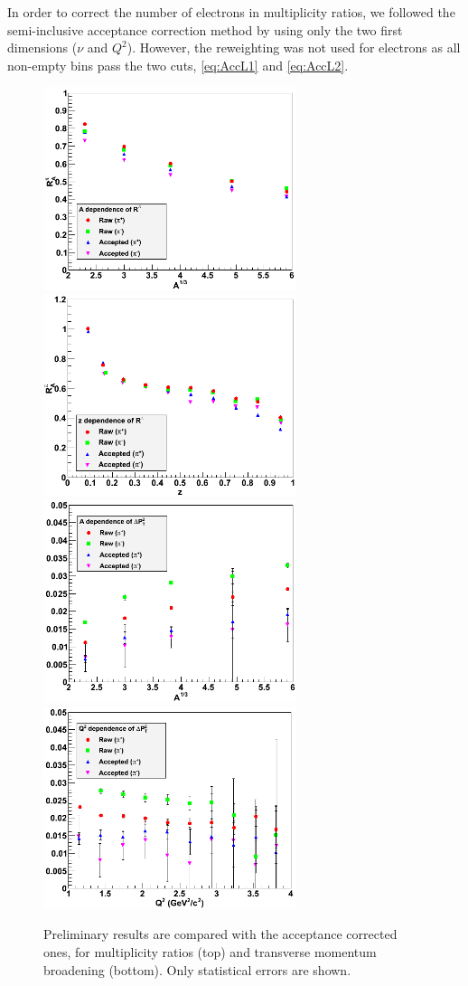 In order to correct the number of electrons in multiplicity ratios, we followed the semi-inclusive acceptance correction method by using only the two first dimensions ($\nu$ and $Q^2$). However, the reweighting was not used for electrons as all non-empty bins pass the two cuts, \ref{eq:AccL1} and \ref{eq:AccL2}.

\begin{figure}[tbp]
\centering
\includegraphics[width=7.4cm] {chap5-fig/b_RvA.png} 
\includegraphics[width=7.4cm] {chap5-fig/b_RvZ.png} 
\includegraphics[width=7.4cm] {chap5-fig/b_PvA.png} 
\includegraphics[width=7.4cm] {chap5-fig/b_PvQ2.png} 
\caption {Preliminary results are compared with the acceptance corrected ones, 
for multiplicity ratios (top) and transverse momentum broadening 
(bottom). Only statistical errors are shown.}
\label{fig:AcceptPlots}
\end{figure}

